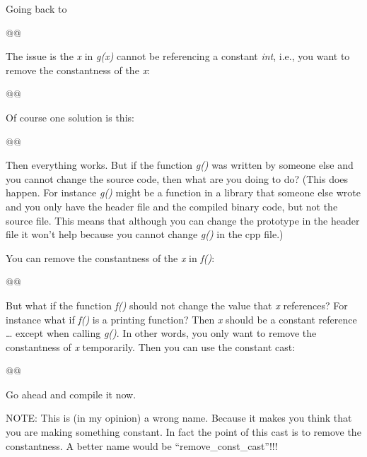 \documentclass[
]{article}
\begin{document}
Going back to

\begin{longtable}[]{@{}@{}}
\toprule\noalign{}
\endhead
\bottomrule\noalign{}
\endlastfoot
\end{longtable}

The issue is the \emph{x} in \emph{g(x)} cannot be referencing a
constant \emph{int}, i.e., you want to remove the constantness of the
\emph{x}:

\begin{longtable}[]{@{}@{}}
\toprule\noalign{}
\endhead
\bottomrule\noalign{}
\endlastfoot
\end{longtable}

Of course one solution is this:

\begin{longtable}[]{@{}@{}}
\toprule\noalign{}
\endhead
\bottomrule\noalign{}
\endlastfoot
\end{longtable}

Then everything works. But if the function \emph{g()} was written by
someone else and you cannot change the source code, then what are you
doing to do? (This does happen. For instance \emph{g()} might be a
function in a library that someone else wrote and you only have the
header file and the compiled binary code, but not the source file. This
means that although you can change the prototype in the header file it
won't help because you cannot change \emph{g()} in the cpp file.)

You can remove the constantness of the \emph{x} in \emph{f()}:

\begin{longtable}[]{@{}@{}}
\toprule\noalign{}
\endhead
\bottomrule\noalign{}
\endlastfoot
\end{longtable}

But what if the function \emph{f()} should not change the value that
\emph{x} references? For instance what if \emph{f()} is a printing
function? Then \emph{x} should be a constant reference \ldots{} except
when calling \emph{g()}. In other words, you only want to remove the
constantness of \emph{x} temporarily. Then you can use the constant
cast:

\begin{longtable}[]{@{}@{}}
\toprule\noalign{}
\endhead
\bottomrule\noalign{}
\endlastfoot
\end{longtable}

Go ahead and compile it now.

NOTE: This is (in my opinion) a wrong name. Because it makes you think
that you are making something constant. In fact the point of this cast
is to remove the constantness. A better name would be
``remove\_const\_cast''!!!
\end{document}
